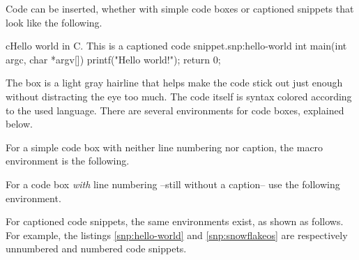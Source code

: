 Code can be inserted, whether with simple code boxes or captioned snippets that look like the following.
\begin{snippet}{c}{Hello world in C. This is a captioned code snippet.}{snp:hello-world}
    int main(int argc, char *argv[]) {
            printf("Hello world!");
            return 0;
        }
\end{snippet}

The box is a light gray hairline that helps make the code stick out just enough without distracting the eye too much. The code itself is syntax colored according to the used language. There are several environments for code boxes, explained below.

For a simple code box with neither line numbering nor caption, the macro environment is the following.

%

For a code box \textit{with} line numbering --still without a caption-- use the following environment.

For captioned code snippets, the same environments exist, as shown as follows. For example, the listings \ref{snp:hello-world} and \ref{snp:snowflakeos} are respectively unnumbered and numbered code snippets.

